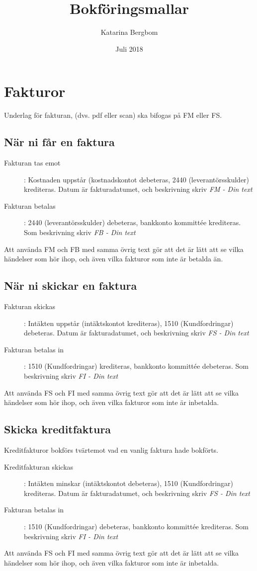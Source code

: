 \documentclass{article}
\title{Bokföringsmallar}
\author{Katarina Bergbom}
\date{Juli 2018}
\begin{document}
\maketitle
\tableofcontents

\section{Fakturor}
Underlag för fakturan, (dvs. pdf eller scan) ska bifogas på FM eller FS.
\subsection{När ni får en faktura}
\begin{description}
    \item [Fakturan tas emot]: Kostnaden uppstår (kostnadskontot debeteras, 2440 (leverantörsskulder) krediteras. Datum är fakturadatumet, och beskrivning skriv \textit{FM - Din text}
    \item [Fakturan betalas]: 2440 (leverantörsskulder) debeteras, bankkonto kommittée krediteras. Som beskrivning skriv \textit{FB - Din text}
\end{description}
Att använda FM och FB med samma övrig text gör att det är lätt att se vilka händelser som hör ihop, och även vilka fakturor som inte är betalda än.
\subsection{När ni skickar en faktura}
\begin{description}
    \item [Fakturan skickas]: Intäkten uppstår (intäktskontot krediteras), 1510 (Kundfordringar) debeteras. Datum är fakturadatumet, och beskrivning skriv \textit{FS - Din text}
    \item [Fakturan betalas in]: 1510 (Kundfordringar) krediteras, bankkonto kommittée debeteras. Som beskrivning skriv \textit{FI - Din text}
\end{description}
Att använda FS och FI med samma övrig text gör att det är lätt att se vilka händelser som hör ihop, och även vilka fakturor som inte är inbetalda.

\subsection{Skicka kreditfaktura}
Kreditfakturor bokförs tvärtemot vad en vanlig faktura hade bokförts.
\begin{description}
    \item [Kreditfakturan skickas]: Intäkten minskar (intäktskontot debeteras), 1510 (Kundfordringar) krediteras. Datum är fakturadatumet, och beskrivning skriv \textit{FS - Din text}
    \item [Fakturan betalas in]: 1510 (Kundfordringar) debeteras, bankkonto kommittée krediteras. Som beskrivning skriv \textit{FI - Din text}
\end{description}
Att använda FS och FI med samma övrig text gör att det är lätt att se vilka händelser som hör ihop, och även vilka fakturor som inte är inbetalda.
\end{document}
